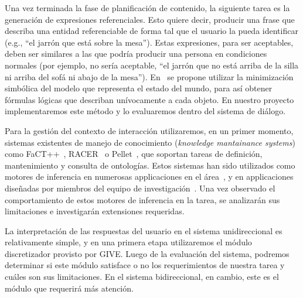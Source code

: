 Una vez terminada la fase de planificaci\'on de contenido, la siguiente tarea
es la generaci\'on de expresiones referenciales. Esto quiere decir, producir una
frase que describa una entidad referenciable de forma tal que el usuario
la pueda identificar (e.g., ``el jarr\'on que est\'a sobre la mesa'').
Estas expresiones, para ser aceptables, deben ser similares a las que podr\'ia
producir una persona en condiciones normales (por ejemplo, no ser\'ia aceptable,
``el jarr\'on que no est\'a arriba de la silla ni arriba del
sof\'a ni abajo de la mesa'').  En~\citep{AKS08} se propone utilizar la
minimizaci\'on simb\'olica del modelo que representa
el estado del mundo, para as\'i obtener f\'ormulas l\'ogicas que describan
un\'ivocamente a cada objeto. En nuestro proyecto implementaremos este m\'etodo
y lo evaluaremos dentro del sistema de di\'alogo.

Para la gesti\'on del contexto de interacci\'on utilizaremos, en un primer
momento, sistemas existentes de manejo de conocimiento (\emph{knowledge mantainance
systems}) como
FaCT++~\citep{horr:fact99},
RACER~\citep{haar:race99} o Pellet~\citep{siri:pell06}, que soportan tareas de
definici\'on, mantenimiento y consulta de ontolog\'ias.  Estos sistemas
han sido utilizados como motores de inferencia
en numerosas applicaciones en el \'area~\citep{franconi03,koller04}, y en
applicaciones
dise\~nadas por miembros del equipo de
investigaci\'on~\citep{benotti07,benotti09b}.  Una vez observado el
comportamiento de
estos motores de inferencia en la tarea, se analizar\'an sus limitaciones
e investigar\'an extensiones requeridas.

La interpretaci\'on de las respuestas del usuario en el sistema unidireccional
es relativamente simple, y en una primera etapa utilizaremos el m\'odulo
discretizador provisto por GIVE.  Luego de la evaluaci\'on del sistema,
podremos determinar si este m\'odulo satisface o no los requerimientos de
nuestra tarea y cu\'ales son sus limitaciones.  En el sistema bidireccional,
en cambio, este es el m\'odulo que requerir\'a m\'as atenci\'on.


